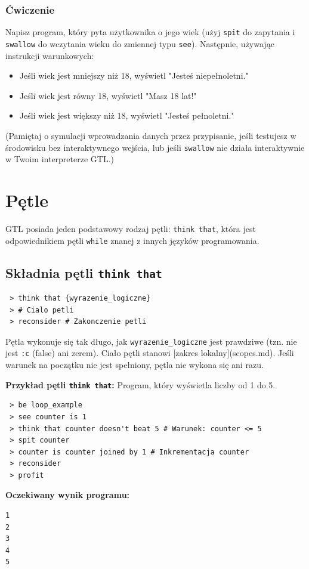 \documentclass[12pt,a4paper]{article}
\begin{document}
\subsubsection*{Ćwiczenie}
Napisz program, który pyta użytkownika o jego wiek (użyj \texttt{spit} do zapytania i \texttt{swallow} do wczytania wieku do zmiennej typu \texttt{see}). Następnie, używając instrukcji warunkowych:
\begin{itemize}
    \item Jeśli wiek jest mniejszy niż 18, wyświetl "Jesteś niepełnoletni."
    \item Jeśli wiek jest równy 18, wyświetl "Masz 18 lat!"
    \item Jeśli wiek jest większy niż 18, wyświetl "Jesteś pełnoletni."
\end{itemize}
(Pamiętaj o symulacji wprowadzania danych przez przypisanie, jeśli testujesz w środowisku bez interaktywnego wejścia, lub jeśli \texttt{swallow} nie działa interaktywnie w Twoim interpreterze GTL.)

\newpage
\section{Pętle}
\label{sec:loops}
GTL posiada jeden podstawowy rodzaj pętli: \texttt{think that}, która jest odpowiednikiem pętli \texttt{while} znanej z innych języków programowania.

\subsection{Składnia pętli \texttt{think that}}
\begin{lstlisting}
 > think that {wyrazenie_logiczne}
 > # Cialo petli
 > reconsider # Zakonczenie petli
\end{lstlisting}
Pętla wykonuje się tak długo, jak \texttt{{wyrazenie\_logiczne}} jest prawdziwe (tzn. nie jest \texttt{:c} (false) ani zerem). Ciało pętli stanowi [zakres lokalny](scopes.md). Jeśli warunek na początku nie jest spełniony, pętla nie wykona się ani razu.

\textbf{Przykład pętli \texttt{think that}:}
Program, który wyświetla liczby od 1 do 5.
\begin{lstlisting}
 > be loop_example
 > see counter is 1
 > think that counter doesn't beat 5 # Warunek: counter <= 5
 > spit counter
 > counter is counter joined by 1 # Inkrementacja counter
 > reconsider
 > profit
\end{lstlisting}
\textbf{Oczekiwany wynik programu:}
\begin{verbatim}
1
2
3
4
5
\end{verbatim}
\end{document}
